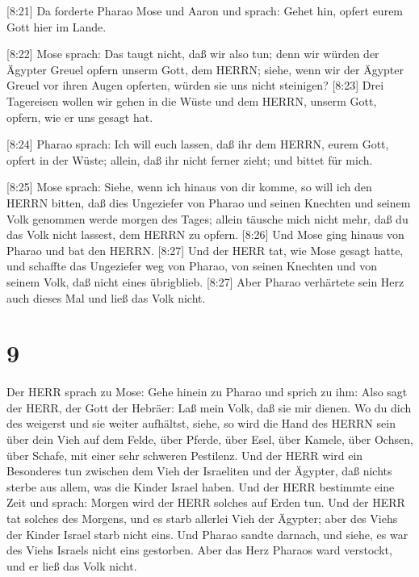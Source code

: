  {[}8:21{]} Da forderte Pharao Mose und Aaron und sprach:
Gehet hin, opfert eurem Gott hier im Lande.

 {[}8:22{]} Mose sprach: Das taugt nicht, daß wir also tun;
denn wir würden der Ägypter Greuel opfern unserm Gott, dem HERRN; siehe,
wenn wir der Ägypter Greuel vor ihren Augen opferten, würden sie uns
nicht steinigen?  {[}8:23{]} Drei Tagereisen wollen wir
gehen in die Wüste und dem HERRN, unserm Gott, opfern, wie er uns gesagt
hat.

 {[}8:24{]} Pharao sprach: Ich will euch lassen, daß ihr
dem HERRN, eurem Gott, opfert in der Wüste; allein, daß ihr nicht ferner
zieht; und bittet für mich.

 {[}8:25{]} Mose sprach: Siehe, wenn ich hinaus von dir
komme, so will ich den HERRN bitten, daß dies Ungeziefer von Pharao und
seinen Knechten und seinem Volk genommen werde morgen des Tages; allein
täusche mich nicht mehr, daß du das Volk nicht lassest, dem HERRN zu
opfern.  {[}8:26{]} Und Mose ging hinaus von Pharao und bat
den HERRN.  {[}8:27{]} Und der HERR tat, wie Mose gesagt
hatte, und schaffte das Ungeziefer weg von Pharao, von seinen Knechten
und von seinem Volk, daß nicht eines übrigblieb. 
{[}8:27{]} Aber Pharao verhärtete sein Herz auch dieses Mal und ließ das
Volk nicht.

\hypertarget{section-8}{%
\section{9}\label{section-8}}

 Der HERR sprach zu Mose: Gehe hinein zu Pharao und sprich
zu ihm: Also sagt der HERR, der Gott der Hebräer: Laß mein Volk, daß sie
mir dienen.  Wo du dich des weigerst und sie weiter
aufhältst,  siehe, so wird die Hand des HERRN sein über dein
Vieh auf dem Felde, über Pferde, über Esel, über Kamele, über Ochsen,
über Schafe, mit einer sehr schweren Pestilenz.  Und der
HERR wird ein Besonderes tun zwischen dem Vieh der Israeliten und der
Ägypter, daß nichts sterbe aus allem, was die Kinder Israel haben.
 Und der HERR bestimmte eine Zeit und sprach: Morgen wird
der HERR solches auf Erden tun.  Und der HERR tat solches
des Morgens, und es starb allerlei Vieh der Ägypter; aber des Viehs der
Kinder Israel starb nicht eins.  Und Pharao sandte darnach,
und siehe, es war des Viehs Israels nicht eins gestorben. Aber das Herz
Pharaos ward verstockt, und er ließ das Volk nicht.

